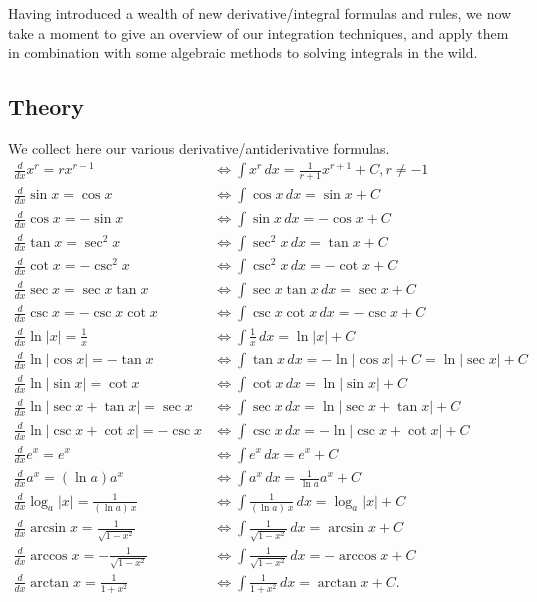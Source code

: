 \thispagestyle{fancy}
Having introduced a wealth of new derivative/integral formulas and rules, we now take a moment to give an overview of our integration techniques, and apply them in combination with some algebraic methods to solving integrals in the wild.

 \subsection*{Theory}
\begin{namedtheorem} We collect here our various derivative/antiderivative formulas.
\begin{align*}
  \frac{d}{dx} x^r=rx^{r-1}& \iff \int x^r \, dx=\frac{1}{r+1}x^{r+1}+C, r\ne -1\\
  \frac{d}{dx} \sin x=\cos x& \iff \int\cos x \, dx=\sin x+C\\
  \frac{d}{dx}\cos x=-\sin x & \iff \int \sin x \, dx=-\cos x+C\\
  \frac{d}{dx}\tan x=\sec^2x & \iff \int \sec^2 x \, dx=\tan x+C\\
  \frac{d}{dx}\cot x=-\csc^2x & \iff \int \csc ^2x\, dx=-\cot x+C\\
  \frac{d}{dx}\sec x=\sec x\tan x & \iff \int \sec x\tan x \, dx=\sec x+C\\
  \frac{d}{dx}\csc x=-\csc x\cot x & \iff \int\csc x\cot x \, dx=-\csc x+C\\
  \frac{d}{dx}\ln\vert x\vert=\frac{1}{x} & \iff \int\frac{1}{x} \, dx=\ln\vert x\vert+C \\
  \frac{d}{dx}\ln\vert \cos x \vert=-\tan x & \iff \int\tan x \, dx=-\ln\vert \cos x \vert+C=\ln\vert\sec x\vert+C \\
  \frac{d}{dx}\ln\vert \sin x\vert=\cot x & \iff \int\cot x \, dx=\ln\vert \sin x\vert+C \\
  \frac{d}{dx}\ln\vert \sec x+\tan x\vert=\sec x & \iff \int\sec x \, dx=\ln\vert \sec x+\tan x\vert+C \\
  \frac{d}{dx}\ln\vert \csc x+\cot x\vert=-\csc x & \iff \int\csc x \, dx=-\ln\vert \csc x+\cot x\vert+C\\
  \frac{d}{dx}e^x=e^x & \iff \int e^x \, dx=e^x+C\\
  \frac{d}{dx}a^x=(\ln a)a^x & \iff \int a^x \, dx=\frac{1}{\ln a}a^x+C\\
  \frac{d}{dx}\log_a \vert x\vert =\frac{1}{(\ln a)\, x} & \iff \int \frac{1}{(\ln a)\, x} \, dx=\log_a\vert x\vert+C\\
  \frac{d}{dx} \arcsin x=\frac{1}{\sqrt{1-x^2}}&\iff \int \frac{1}{\sqrt{1-x^2}}\, dx=\arcsin x+C \\
  \frac{d}{dx} \arccos x=-\frac{1}{\sqrt{1-x^2}}&\iff \int \frac{1}{\sqrt{1-x^2}}\, dx=-\arccos x+C \\
  \frac{d}{dx} \arctan x=\frac{1}{1+x^2}&\iff \int \frac{1}{1+x^2}\, dx=\arctan x+C .
\end{align*}

\end{namedtheorem}

